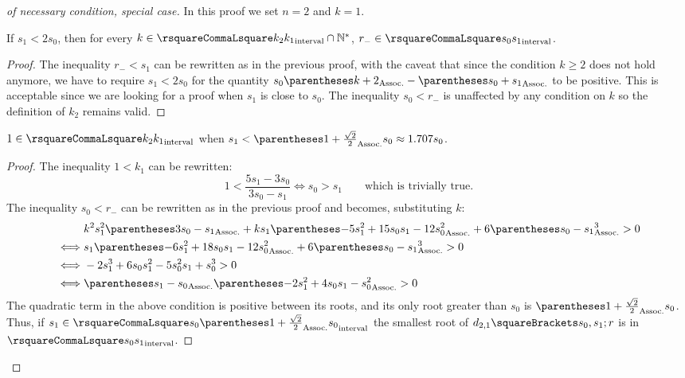\documentclass[10pt, a4paper, twoside]{basestyle}
\begin{document}
\begin{proof}[of necessary condition, special case]
In this proof we set $n=2$ and $k=1$.
\begin{claim}
If $s_1<2s_0$, then for every $k \in \intopen{k_2}{k_1}\Intersection{\Positives}$, $r_- \in \intopen{s_0}{s_1}$.
\begin{proof}
The inequality $r_-<s_1$ can be rewritten as in the previous proof, with the caveat that since the condition $k≥2$ does not hold anymore, we have to require $s_1<2s_0$ for the quantity $s_0\pa{k+2}-\pa{s_0+s_1}$ to be positive.  This is acceptable since we are looking for a proof when $s_1$ is close to $s_0$.  The inequality $s_0<r_-$ is unaffected by any condition on $k$ so the definition of $k_2$ remains valid.
\end{proof}
\end{claim}
\begin{claim}
$1 \in \intopen{k_2}{k_1}$ when $s_1<\pa{1+\frac{\sqrt{2}}{2}}s_0 \approx 1.707s_0$.
\begin{proof}
The inequality $1<k_1$ can be rewritten:
\[
1 < \frac{5s_1-3s_0}{3s_0-s_1} \iff s_0 > s_1 \qquad\text{which is trivially true.}
\]
The inequality $s_0<r_-$ can be rewritten as in the previous proof and becomes, substituting $k$:
\begin{align*}
&k^2 s_1^2\pa{3s_0-s_1} + k s_1\pa{-5s_1^2 + 15 s_0 s_1 - 12s_0^2} + 6\pa{s_0-s_1}^3 > 0 \\
\iff &s_1\pa{-6s_1^2 + 18 s_0 s_1 - 12 s_0^2} + 6\pa{s_0-s_1}^3 > 0 \\
\iff &-2s_1^3 + 6 s_0 s_1^2 - 5 s_0^2 s_1 + s_0^3 > 0 \\
\iff &\pa{s_1 - s_0}\pa{-2 s_1^2 + 4 s_0 s_1 - s_0^2} > 0
\end{align*}
The quadratic term in the above condition is positive between its roots, and its only root greater than $s_0$ is $\pa{1+\frac{\sqrt{2}}{2}}s_0$.  Thus, if $s_1 \in \intopen{s_0}{\pa{1+\frac{\sqrt{2}}{2}}s_0}$ the smallest root of $d_{2,1}\of{s_0, s_1; r}$ is in $\intopen{s_0} {s_1}$.
\end{proof}
\end{claim}
\end{proof}
\end{document}
